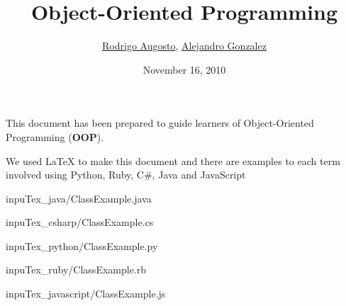 \documentclass[14pt]{article}
\title{Object-Oriented Programming}
\author{\href{http://twitter.com/coto}{Rodrigo Augosto}, \href{http://twitter.com/janogonzalez}{Alejandro Gonzalez} }
\date{November 16, 2010}
\begin{document}
\maketitle						%

This document has been prepared to guide learners of 
Object-Oriented Programming (\textbf{OOP}).
 
We used \LaTeX{} to make this document and there are
examples to each term involved using Python, Ruby, C\#, Java and JavaScript

\tableofcontents





	\begin{center} 
		
		{inpuTex_java/ClassExample.java} 
	\end{center}

	\begin{center} 
		
		{inpuTex_csharp/ClassExample.cs} 
	\end{center}

	\begin{center} 
		
		{inpuTex_python/ClassExample.py} 
	\end{center}

	\begin{center} 
		
		{inpuTex_ruby/ClassExample.rb} 
	\end{center}

	\begin{center} 
		
		{inpuTex_javascript/ClassExample.js} 
	\end{center}













\end{document}
